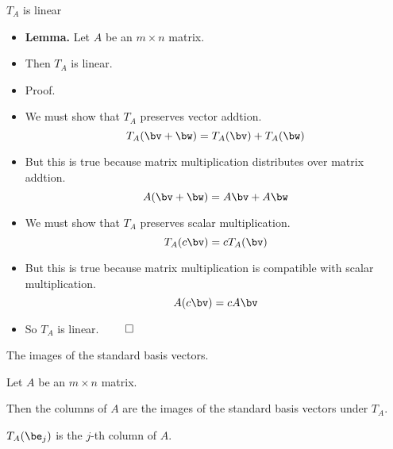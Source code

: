\documentclass{beamer}
\begin{document}
\begin{frame}{$T_A$ is linear}

\begin{itemize}
\item \textbf{Lemma.} Let $A$ be an $m\times n$ matrix.
\item Then $T_A$ is linear.
\item Proof.
\item We must show that $T_A$ preserves vector addtion.
$$T_A(\bv + \bw) = T_A(\bv) + T_A(\bw)$$
\item But this is true because matrix multiplication distributes over matrix addtion.
$$A(\bv + \bw) = A\bv + A\bw$$
\item We must show that $T_A$ preserves scalar multiplication.
$$T_A(c \bv) = c T_A(\bv)$$
\item But this is true because matrix multiplication is compatible with scalar multiplication.
$$A(c \bv ) = c A\bv$$
\item So $T_A$ is linear. $\qed$
\end{itemize}
\end{frame}

\beamerdefaultoverlayspecification{}

\begin{frame}{The images of the standard basis vectors.}

\begin{lemma}
Let $A$ be an $m\times n$ matrix.

\pause

\bigskip

Then the columns of $A$ are the
images of the standard basis vectors under $T_A$.

\bigskip


\pause

$T_A(\be_j)$ is the $j$-th column of $A$.
\end{lemma}
\end{frame}

\end{document}
